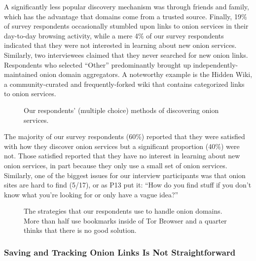 A significantly less popular discovery mechanism was through friends and family,
which has the advantage that domains come from a trusted source.    Finally, 19\% of survey respondents occasionally stumbled upon links to
onion services in their day-to-day browsing activity, while a mere 4\% of our
survey respondents indicated that they were not interested in learning about new
onion services.  Similarly, two interviewees claimed that they never searched
for new onion links.  Respondents who selected ``Other'' predominantly brought
up independently-maintained onion domain aggregators.  A noteworthy example is
the Hidden Wiki, a community-curated and frequently-forked wiki that contains
categorized links to onion services.

\begin{figure}[t]
    \centering
    
    \caption{Our respondents' (multiple choice) methods of discovering onion
    services.}
    \label{fig:onion-discovery}
\end{figure}

The majority of our survey respondents (60\%) reported that they were satisfied
with how they discover onion services but a significant proportion (40\%) were
not. Those satisfied reported that they have no interest in learning about new
onion services, in part because they only use a small set of onion services.
Similarly, one of the biggest issues for our interview participants was that
onion sites are hard to find (5/17), or as P13 put it: ``How do you find stuff
if you don't know what you're looking for or only have a vague idea?''

\begin{figure}[t]
    \centering
    
    \caption{The strategies that our respondents use to handle onion domains.
    More than half use bookmarks inside of Tor Browser and a quarter thinks that
    there is no good solution.}
    \label{fig:onion-domain-mgmt}
\end{figure}

\subsubsection{Saving and Tracking Onion Links Is Not Straightforward}

